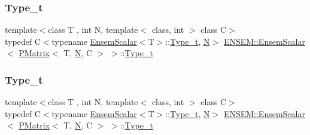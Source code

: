 \subsubsection{\texorpdfstring{Type\_t}{Type\_t}\hspace{0.1cm}{\footnotesize\ttfamily [1/3]}}
{\footnotesize\ttfamily template$<$class T , int N, template$<$ class, int $>$ class C$>$ \\
typedef C$<$typename \mbox{\hyperlink{structENSEM_1_1EnsemScalar}{Ensem\+Scalar}}$<$T$>$\+::\mbox{\hyperlink{structENSEM_1_1EnsemScalar_3_01PMatrix_3_01T_00_01N_00_01C_01_4_01_4_a63cd7ffca7507ffb61823092f6d0f8db}{Type\+\_\+t}}, \mbox{\hyperlink{adat__devel_2lib_2hadron_2operator__name__util_8cc_a7722c8ecbb62d99aee7ce68b1752f337}{N}}$>$ \mbox{\hyperlink{structENSEM_1_1EnsemScalar}{E\+N\+S\+E\+M\+::\+Ensem\+Scalar}}$<$ \mbox{\hyperlink{classENSEM_1_1PMatrix}{P\+Matrix}}$<$ T, \mbox{\hyperlink{adat__devel_2lib_2hadron_2operator__name__util_8cc_a7722c8ecbb62d99aee7ce68b1752f337}{N}}, C $>$ $>$\+::\mbox{\hyperlink{structENSEM_1_1EnsemScalar_3_01PMatrix_3_01T_00_01N_00_01C_01_4_01_4_a63cd7ffca7507ffb61823092f6d0f8db}{Type\+\_\+t}}}

\mbox{\label{structENSEM_1_1EnsemScalar_3_01PMatrix_3_01T_00_01N_00_01C_01_4_01_4_a63cd7ffca7507ffb61823092f6d0f8db}} 
\subsubsection{\texorpdfstring{Type\_t}{Type\_t}\hspace{0.1cm}{\footnotesize\ttfamily [2/3]}}
{\footnotesize\ttfamily template$<$class T , int N, template$<$ class, int $>$ class C$>$ \\
typedef C$<$typename \mbox{\hyperlink{structENSEM_1_1EnsemScalar}{Ensem\+Scalar}}$<$T$>$\+::\mbox{\hyperlink{structENSEM_1_1EnsemScalar_3_01PMatrix_3_01T_00_01N_00_01C_01_4_01_4_a63cd7ffca7507ffb61823092f6d0f8db}{Type\+\_\+t}}, \mbox{\hyperlink{adat__devel_2lib_2hadron_2operator__name__util_8cc_a7722c8ecbb62d99aee7ce68b1752f337}{N}}$>$ \mbox{\hyperlink{structENSEM_1_1EnsemScalar}{E\+N\+S\+E\+M\+::\+Ensem\+Scalar}}$<$ \mbox{\hyperlink{classENSEM_1_1PMatrix}{P\+Matrix}}$<$ T, \mbox{\hyperlink{adat__devel_2lib_2hadron_2operator__name__util_8cc_a7722c8ecbb62d99aee7ce68b1752f337}{N}}, C $>$ $>$\+::\mbox{\hyperlink{structENSEM_1_1EnsemScalar_3_01PMatrix_3_01T_00_01N_00_01C_01_4_01_4_a63cd7ffca7507ffb61823092f6d0f8db}{Type\+\_\+t}}}

